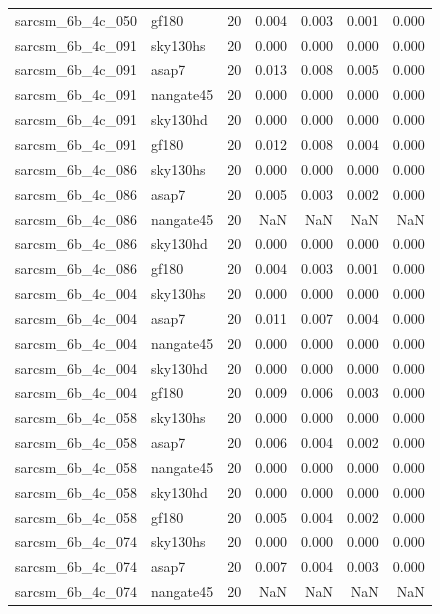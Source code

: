 \begin{tabular}{llrrrrr}
sarcsm\_6b\_4c\_050 & gf180 & 20 & 0.004 & 0.003 & 0.001 & 0.000 \\
sarcsm\_6b\_4c\_091 & sky130hs & 20 & 0.000 & 0.000 & 0.000 & 0.000 \\
sarcsm\_6b\_4c\_091 & asap7 & 20 & 0.013 & 0.008 & 0.005 & 0.000 \\
sarcsm\_6b\_4c\_091 & nangate45 & 20 & 0.000 & 0.000 & 0.000 & 0.000 \\
sarcsm\_6b\_4c\_091 & sky130hd & 20 & 0.000 & 0.000 & 0.000 & 0.000 \\
sarcsm\_6b\_4c\_091 & gf180 & 20 & 0.012 & 0.008 & 0.004 & 0.000 \\
sarcsm\_6b\_4c\_086 & sky130hs & 20 & 0.000 & 0.000 & 0.000 & 0.000 \\
sarcsm\_6b\_4c\_086 & asap7 & 20 & 0.005 & 0.003 & 0.002 & 0.000 \\
sarcsm\_6b\_4c\_086 & nangate45 & 20 & NaN & NaN & NaN & NaN \\
sarcsm\_6b\_4c\_086 & sky130hd & 20 & 0.000 & 0.000 & 0.000 & 0.000 \\
sarcsm\_6b\_4c\_086 & gf180 & 20 & 0.004 & 0.003 & 0.001 & 0.000 \\
sarcsm\_6b\_4c\_004 & sky130hs & 20 & 0.000 & 0.000 & 0.000 & 0.000 \\
sarcsm\_6b\_4c\_004 & asap7 & 20 & 0.011 & 0.007 & 0.004 & 0.000 \\
sarcsm\_6b\_4c\_004 & nangate45 & 20 & 0.000 & 0.000 & 0.000 & 0.000 \\
sarcsm\_6b\_4c\_004 & sky130hd & 20 & 0.000 & 0.000 & 0.000 & 0.000 \\
sarcsm\_6b\_4c\_004 & gf180 & 20 & 0.009 & 0.006 & 0.003 & 0.000 \\
sarcsm\_6b\_4c\_058 & sky130hs & 20 & 0.000 & 0.000 & 0.000 & 0.000 \\
sarcsm\_6b\_4c\_058 & asap7 & 20 & 0.006 & 0.004 & 0.002 & 0.000 \\
sarcsm\_6b\_4c\_058 & nangate45 & 20 & 0.000 & 0.000 & 0.000 & 0.000 \\
sarcsm\_6b\_4c\_058 & sky130hd & 20 & 0.000 & 0.000 & 0.000 & 0.000 \\
sarcsm\_6b\_4c\_058 & gf180 & 20 & 0.005 & 0.004 & 0.002 & 0.000 \\
sarcsm\_6b\_4c\_074 & sky130hs & 20 & 0.000 & 0.000 & 0.000 & 0.000 \\
sarcsm\_6b\_4c\_074 & asap7 & 20 & 0.007 & 0.004 & 0.003 & 0.000 \\
sarcsm\_6b\_4c\_074 & nangate45 & 20 & NaN & NaN & NaN & NaN \\

\end{tabular}
